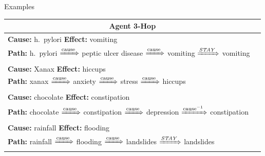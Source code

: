 \documentclass[table]{beamer}
\begin{document}
\begin{frame}{Examples}
  \begin{table}
    \centering
    \scriptsize
    \begin{tabular}{m{10cm} m{0.2cm}}
      \toprule
      \multicolumn{2}{c}{\textbf{Agent 3-Hop}} \\
      \midrule
       \vspace{0.2cm}
      \textbf{Cause:} h.\ pylori \hspace{0.54cm} \textbf{Effect:} vomiting &\\ 
       \vspace{0.2cm}
      \textbf{Path:} h.\ pylori $\xRightarrow{\text{cause}}$ peptic ulcer disease $\xRightarrow{\text{cause}}$ vomiting $\xRightarrow{\text{\textit{STAY}}}$ vomiting \vspace{0.2cm}\\
      \midrule
       \vspace{0.2cm}
      \textbf{Cause:} Xanax \hspace{0.92cm} \textbf{Effect:} hiccups &\\ 
       \vspace{0.2cm}
      \textbf{Path:} xanax $\xRightarrow{\text{cause}}$ anxiety $\xRightarrow{\text{cause}}$ stress $\xRightarrow{\text{cause}}$ hiccups \vspace{0.2cm}\\
      \midrule
       \vspace{0.2cm}
      \textbf{Cause:} chocolate \hspace{0.39cm} \textbf{Effect:} constipation &\\ 
       \vspace{0.2cm}
      \textbf{Path:} chocolate $\xRightarrow{\text{cause}}$ constipation $\xRightarrow{\text{cause}}$ depression $\xRightarrow{\text{cause}^{-1}}$ constipation \vspace{0.2cm}\\
      \midrule
       \vspace{0.2cm}
      \textbf{Cause:} rainfall \hspace{0.80cm} \textbf{Effect:} flooding &\\ 
       \vspace{0.2cm}
      \textbf{Path:} rainfall $\xRightarrow{\text{cause}}$ flooding $\xRightarrow{\text{cause}}$ landslides $\xRightarrow{\text{\textit{STAY}}}$ landslides \vspace{0.2cm}\\
      \bottomrule
    \end{tabular}
    \end{table}
\end{frame}
\end{document}
